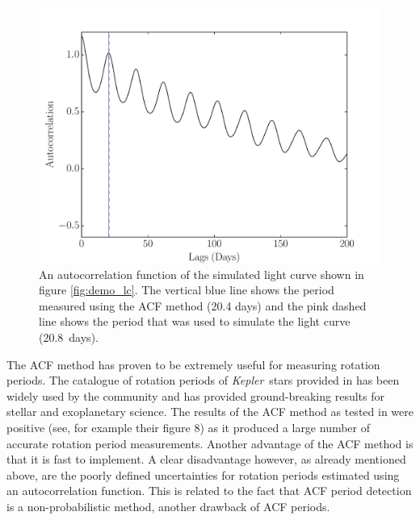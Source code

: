 \documentclass[useAMS, usenatbib, preprint, 12pt]{aastex}
\newcommand{\aigrainexampleperiod}{20.8}
\newcommand{\Kepler}{{\it Kepler}}
\begin{document}
\begin{figure}
\begin{center}
\includegraphics[width=6in, clip=true]{figures/demo_ACF.pdf}
\caption[ACF of a simulated light curve.]
{An autocorrelation function of the simulated light curve shown in figure
\ref{fig:demo_lc}.
The vertical blue line shows the period measured using the ACF method (20.4
days) and the pink dashed line shows the period that was used to simulate the
light curve (\aigrainexampleperiod\ days).}
\label{fig:demo_acf}
\end{center}
\end{figure}

The ACF method has proven to be extremely useful for measuring rotation
periods.
The catalogue of rotation periods of \Kepler\ stars provided in
\citet{Mcquillan2013} has been widely used by the community and has provided
ground-breaking results for stellar and exoplanetary science.
The results of the ACF method as tested in \citet{Aigrain2015} were positive
(see, for example their figure 8) as it produced a large number of accurate
rotation period measurements.
Another advantage of the ACF method is that it is fast to implement.
A clear disadvantage however, as already mentioned above, are the poorly
defined uncertainties for rotation periods estimated using an autocorrelation
function.
This is related to the fact that ACF period detection is a non-probabilistic
method, another drawback of ACF periods.
\end{document}

